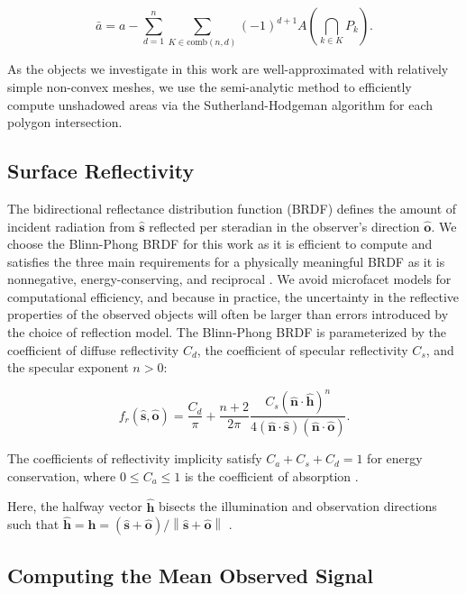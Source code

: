 \documentclass[a4paper,twocolumn]{spaceDebrisC} %
\newcommand{\vctr}[1]{\bm{#1}}
\newcommand{\unitv}[1]{\hat{\vctr{#1}}}
\newcommand{\norm}[1]{\left\lVert#1\right\rVert}
\begin{document}
\begin{equation} \label{eq:us_area}
 \bar{a} = a - \sum_{d=1}^{n} \sum_{K \in \text{comb}(n,d)} (-1)^{d+1} A\left(\bigcap\limits_{k \in K} P_k\right).
\end{equation}

As the objects we investigate in this work are well-approximated with relatively simple non-convex meshes, we use the semi-analytic method to efficiently compute unshadowed areas via the Sutherland-Hodgeman algorithm \cite{sutherland1974} for each polygon intersection.

\subsection{Surface Reflectivity}

The bidirectional reflectance distribution function (BRDF) defines the amount of incident radiation from $\unitv{s}$ reflected per steradian in the observer's direction $\unitv{o}$. We choose the Blinn-Phong \cite{blinn1977} BRDF for this work as it is efficient to compute and satisfies the three main requirements for a physically meaningful BRDF as it is nonnegative, energy-conserving, and reciprocal \cite{duvenhage2013}. We avoid microfacet models for computational efficiency, and because in practice, the uncertainty in the reflective properties of the observed objects will often be larger than errors introduced by the choice of reflection model. The Blinn-Phong BRDF is parameterized by the coefficient of diffuse reflectivity $C_d$, the coefficient of specular reflectivity $C_s$, and the specular exponent $n>0$:

\begin{equation} \label{eq:brdf_blinn_phong}
 f_r(\unitv{s}, \unitv{o}) = \frac{C_d}{\pi} + \frac{n+2}{2\pi} \frac{C_s (\unitv{n} \cdot \unitv{h})^n}{4 (\unitv{n} \cdot \unitv{s})(\unitv{n} \cdot \unitv{o})}.
\end{equation}

The coefficients of reflectivity implicity satisfy $C_a + C_s + C_d = 1$ for energy conservation, where $ 0 \leq C_a \leq 1$ is the coefficient of absorption \cite{fan2020thesis}.

Here, the halfway vector $\unitv{h}$ bisects the illumination and observation directions such that $\unitv{h} = \unitv{h} = (\unitv{s} + \unitv{o})/\norm{\unitv{s} + \unitv{o}}$ \cite{duvenhage2013}.

\subsection{Computing the Mean Observed Signal}
\end{document}

